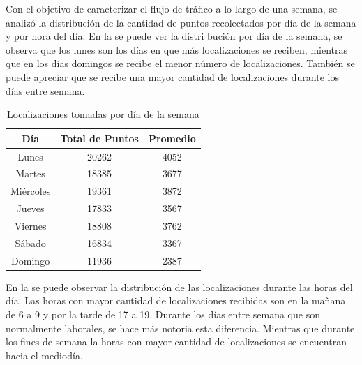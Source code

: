 Con el objetivo de caracterizar el flujo de tráfico a lo largo de una semana, se analizó la distribución de la cantidad de puntos recolectados por día de la semana y por hora del día. En la  se puede ver la distri
bución por día de la semana, se observa que los lunes son los días en que más localizaciones se reciben, mientras que en los días domingos se recibe el menor número de localizaciones. También se puede apreciar que se recibe una mayor cantidad de localizaciones durante los días entre semana.

\begin{table}[h]
	\centering
	\begin{tabular}{ccc}
        \toprule
    	Día  & Total de Puntos & Promedio\\
    	\midrule
    	Lunes & 20262 & 4052 \\
    	Martes & 18385 & 3677 \\
    	Miércoles & 19361  & 3872 \\ 
    	Jueves & 17833 & 3567 \\
    	Viernes & 18808 & 3762 \\
    	Sábado & 16834 & 3367 \\
    	Domingo & 11936 & 2387 \\
    	\bottomrule
	\end{tabular}
	\caption{Localizaciones tomadas por día de la semana} 
	\label{table:localizaciones_por_dia}
\end{table}

En la  se puede observar la distribución de las localizaciones durante las horas del día. Las horas con mayor cantidad de localizaciones recibidas son en la mañana de 6 a 9 y por la tarde de 17 a 19. Durante los días entre semana que son normalmente laborales, se hace más notoria esta diferencia. Mientras que durante los fines de semana la horas con mayor cantidad de localizaciones se encuentran hacia el mediodía.

